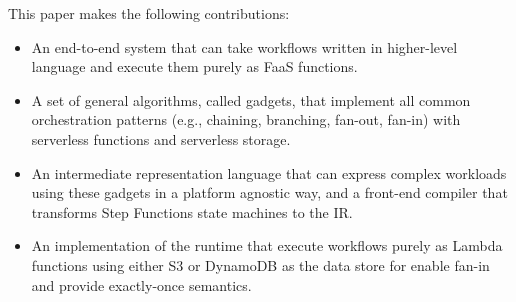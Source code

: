 



This paper makes the following contributions:

\begin{itemize}

  \item An end-to-end system that can take workflows written in higher-level
  language and execute them purely as FaaS functions.

  \item A set of general algorithms, called gadgets, that implement all common
  orchestration patterns (e.g., chaining, branching, fan-out, fan-in) with
  serverless functions and serverless storage.

  \item An intermediate representation language that can express complex
  workloads using these gadgets in a platform agnostic way, and a front-end
  compiler that transforms Step Functions state machines to the IR.

  \item An implementation of the \name{} runtime that execute workflows purely
  as Lambda functions using either S3 or DynamoDB as the data store for enable
  fan-in and provide exactly-once semantics.

\end{itemize}

